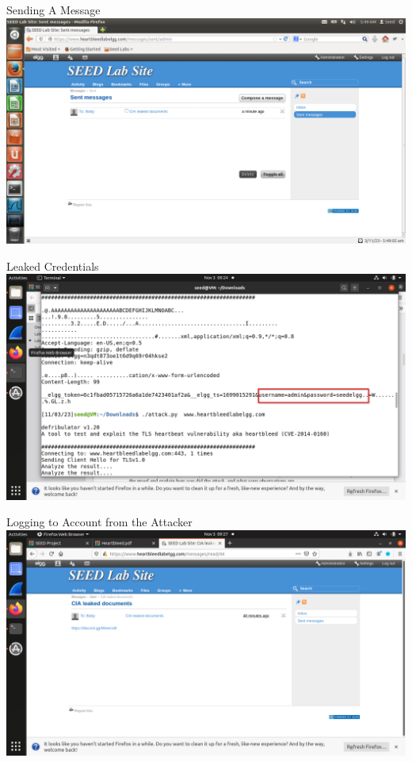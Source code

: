\documentclass{beamer}
\begin{document}
  \begin{frame}{Sending A Message}
    \includegraphics[width=\textwidth]{sent_message.png}
  \end{frame}

  \begin{frame}{Leaked Credentials}
    \includegraphics[width=\textwidth]{leaked_credentials.png}
  \end{frame}

  \begin{frame}{Logging to Account from the Attacker}
    \includegraphics[width=\textwidth]{attacker_sent_message.png}
  \end{frame}
\end{document}
